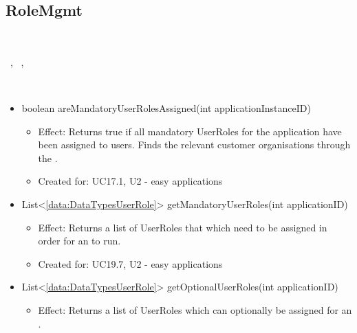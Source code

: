   \subsection{RoleMgmt}\label{int:OnlineServiceOnlineServiceUserManagerRoleMgmt}
    \begin{description}
      \item[Provided by:] \iconcomponent{}~
      \item[Required by:] \iconcomponent{}~, \iconcomponent{}~, \iconcomponent{}~
      \item[Operations:] ~
    \begin{itemize}[noitemsep,nolistsep,leftmargin=-.25cm]
      \item \textsf{boolean areMandatoryUserRolesAssigned(int applicationInstanceID)}
        \begin{itemize}[noitemsep,nolistsep]
           \item Effect: Returns true if all mandatory UserRoles for the application have been assigned to users. Finds the relevant customer organisations through the .
\item Created for: UC17.1, U2 - easy applications
        \end{itemize}
      \item \textsf{List\textless{}\ref{data:DataTypesUserRole}\textgreater{} getMandatoryUserRoles(int applicationID)}
        \begin{itemize}[noitemsep,nolistsep]
           \item Effect: Returns a list of UserRoles that which need to be assigned in order for an  to run.
\item Created for: UC19.7, U2 - easy applications
        \end{itemize}
      \item \textsf{List\textless{}\ref{data:DataTypesUserRole}\textgreater{} getOptionalUserRoles(int applicationID)}
        \begin{itemize}[noitemsep,nolistsep]
           \item Effect: Returns a list of UserRoles which can optionally be assigned for an .

\end{itemize}
\end{itemize}
\end{description}
